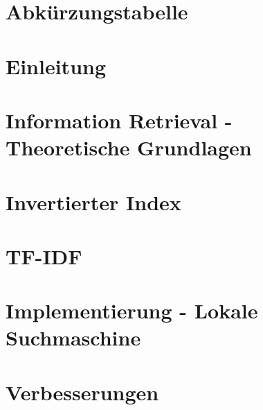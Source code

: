 \documentclass[12pt, a4paper]{scrreprt}
\renewcommand{\headrulewidth}{0.2pt}
\renewcommand{\headrulewidth}{0pt}
\begin{document}
	\chapter*{Abkürzungstabelle}
	\label{abkürzung}
	
	\thispagestyle{empty}
	\pagestyle{fancy}
	\begin{spacing}{1.5}	
		\chapter{Einleitung}
		\label{einleitung}
		
		\chapter{Information Retrieval - Theoretische Grundlagen}
		\label{grundlagen}
		
		\chapter{Invertierter Index}
		\label{invertindex}
		
		\chapter{TF-IDF}
		\label{tfidf}
		
		\chapter{Implementierung - Lokale Suchmaschine}
		\label{impl}
		
		\chapter{Verbesserungen}
		\label{improvements}
		
	\end{spacing}
	\newpage
	\fancypagestyle{plain}{
		\fancyhf{}
		\renewcommand{\headrulewidth}{0pt}
		\lfoot{}
		\cfoot{\thepage}
		\rfoot{}
	}
	\pagestyle{plain}
	\printbibliography
\end{document}

